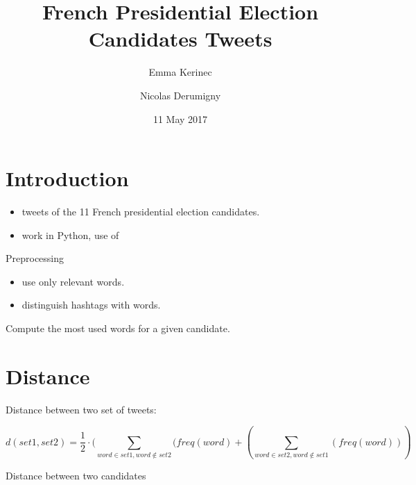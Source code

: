 \documentclass{beamer}
\title[DM-Project 2]{French Presidential Election Candidates Tweets}
\author[E. Kerinec and N. Derumigny]{Emma Kerinec \and Nicolas Derumigny}
\institute[]{ENS Lyon}
\date{11 May 2017}
\begin{document}
\begin{frame}
	\titlepage
	\begin{center}
	\end{center}
\end{frame}



\section{Introduction}
\begin{frame}
\begin{itemize}
\item tweets of the 11 French presidential election candidates.
\item work in Python, use of
\end{itemize}

\end{frame}


\begin{frame}{Preprocessing}
\begin{block}{}
\begin{itemize}
\item use only relevant words.
\item distinguish hashtags with words.
\end{itemize}
\end{block}
\end{frame}

\begin{frame}
Compute the most used words for a given candidate.
\end{frame}


\section{Distance}
\begin{frame}{Distance between two set of tweets:}
\begin{block}{}
\[
d(set1, set2)=\frac{1}{2}\cdot(\sum_{word \in set1, word \notin set2}(freq(word)+(\sum_{word \in set2, word \notin set1}(freq(word))) 
\]
\end{block}
\end{frame}

\begin{frame}{Distance between two candidates}
\begin{block}{}
\end{block}
\end{frame}
\end{document}
